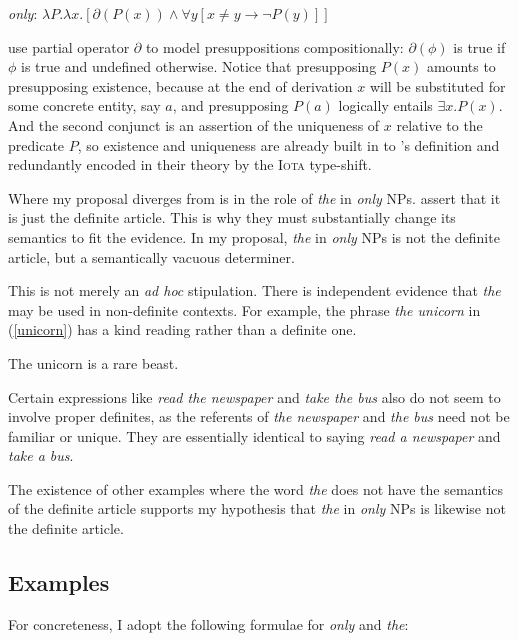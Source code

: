 \begin{exe}
	\ex \textit{only}: $ \lambda P . \lambda x . [ \partial(P(x)) \land \forall y [ x \ne y \to \neg P(y) ] ] $
\end{exe}

\citeauthor{cb2015} use  partial operator $\partial$ to model presuppositions compositionally: $\partial(\phi)$ is true if $\phi$ is true and undefined otherwise. Notice that presupposing $P(x)$ amounts to presupposing existence, because at the end of derivation $x$ will be substituted for some concrete entity, say $a$, and presupposing $P(a)$ logically entails $\exists x . P(x)$. And the second conjunct is an assertion of the uniqueness of $x$ relative to the predicate $P$, so existence and uniqueness are already built in to \citeauthor{cb2015}'s definition and redundantly encoded in their theory by the \textsc{Iota} type-shift.

Where my proposal diverges from  is in the role of \textit{the} in \textit{only} NPs. \citeauthor{cb2015} assert that it is just the definite article. This is why they must substantially change its semantics to fit the evidence. In my proposal, \textit{the} in \textit{only} NPs is not the definite article, but a semantically vacuous determiner.

This is not merely an \textit{ad hoc} stipulation. There is independent evidence that \textit{the} may be used in non-definite contexts. For example, the phrase \textit{the unicorn} in (\ref{unicorn}) has a kind reading rather than a definite one.

\begin{exe}
	\ex \label{unicorn} The unicorn is a rare beast.
\end{exe}

Certain expressions like \textit{read the newspaper} and \textit{take the bus} also do not seem to involve proper definites, as the referents of \textit{the newspaper} and \textit{the bus} need not be familiar or unique. They are essentially identical to saying \textit{read a newspaper} and \textit{take a bus}.

The existence of other examples where the word \textit{the} does not have the semantics of the definite article supports my hypothesis that \textit{the} in \textit{only} NPs is likewise not the definite article.

\subsection{Examples}
For concreteness, I adopt the following formulae for \textit{only} and \textit{the}:

